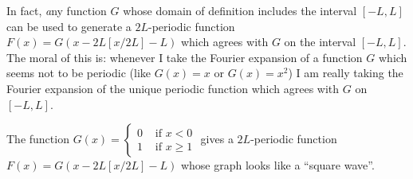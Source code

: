 In fact, {\emph any} function $G$ whose domain of definition includes the interval $[-L,L]$ can be used to generate a $2L$-periodic function $F(x)=G(x-2L[x/2L]-L)$ which agrees with $G$ on the interval $[-L,L]$. The moral of this is: whenever I take the Fourier expansion of a function $G$ which seems not to be periodic (like $G(x)=x$ or $G(x)=x^2$) I am really taking the Fourier expansion of the unique periodic function which agrees with $G$ on $[-L,L]$.

\begin{exm}
The function $G(x)=\begin{cases}0&\mbox{ if }x<0\\ 1&\mbox{ if }x\geq 1\end{cases}$ gives a $2L$-periodic function $F(x)=G(x-2L[x/2L]-L)$ whose graph looks like a ``square wave''.
\end{exm}

\fi